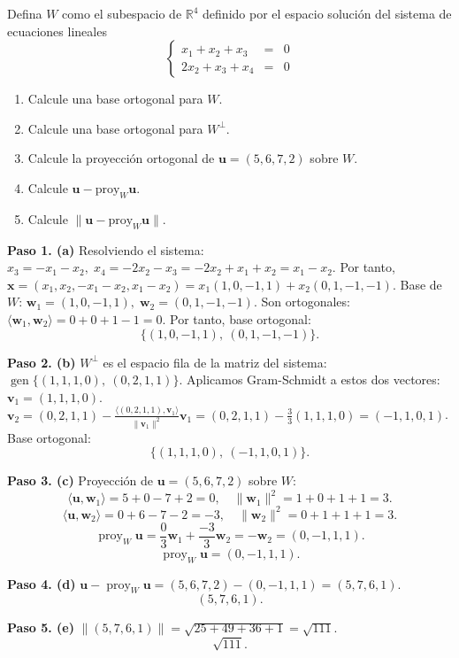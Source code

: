\begin{prob}
Defina $W$ como el subespacio de $\mathbb{R}^4$ definido por el espacio solución del sistema de ecuaciones lineales
\[
\left\lbrace
\begin{array}{ccc}
x_1+x_2+x_3&=&0\\
2x_2+x_3+x_4&=&0
\end{array}
\right.
\]
\begin{enumerate}
\item Calcule una base ortogonal para $W$.
\item Calcule una base ortogonal para $W^{\perp}$.
\item Calcule la proyección ortogonal de $\mathbf{u}=(5,6,7,2)$ sobre $W$.
\item Calcule $\mathbf{u}-\text{proy}_{W}\mathbf{u}$.
\item Calcule $\lVert \mathbf{u}-\text{proy}_{W}\mathbf{u}\rVert$.
\end{enumerate}
\begin{myproof}
\textbf{Paso 1. (a)} Resolviendo el sistema:
\( x_3 = -x_1 - x_2,\; x_4 = -2x_2 - x_3 = -2x_2 + x_1 + x_2 = x_1 - x_2 \).
Por tanto, \( \mathbf{x} = (x_1, x_2, -x_1 - x_2, x_1 - x_2) = x_1(1,0,-1,1) + x_2(0,1,-1,-1) \).
Base de \( W \): \( \mathbf{w}_1 = (1,0,-1,1),\; \mathbf{w}_2 = (0,1,-1,-1) \).
Son ortogonales: \( \langle \mathbf{w}_1, \mathbf{w}_2 \rangle = 0 + 0 + 1 -1 = 0 \).
Por tanto, base ortogonal:
\[
\boxed{\{(1,0,-1,1),\ (0,1,-1,-1)\}}.
\]

\textbf{Paso 2. (b)} \( W^\perp \) es el espacio fila de la matriz del sistema:
\( \operatorname{gen}\{(1,1,1,0),\ (0,2,1,1)\} \).
Aplicamos Gram-Schmidt a estos dos vectores:
\( \mathbf{v}_1 = (1,1,1,0) \).
\( \mathbf{v}_2 = (0,2,1,1) - \frac{\langle (0,2,1,1), \mathbf{v}_1 \rangle}{\|\mathbf{v}_1\|^2} \mathbf{v}_1
= (0,2,1,1) - \frac{3}{3}(1,1,1,0) = (-1,1,0,1) \).
Base ortogonal:
\[
\boxed{\{(1,1,1,0),\ (-1,1,0,1)\}}.
\]

\textbf{Paso 3. (c)} Proyección de \( \mathbf{u}=(5,6,7,2) \) sobre \( W \):
\[
\langle \mathbf{u}, \mathbf{w}_1 \rangle = 5 + 0 -7 + 2 = 0,\quad \|\mathbf{w}_1\|^2 = 1+0+1+1 = 3.
\]
\[
\langle \mathbf{u}, \mathbf{w}_2 \rangle = 0 + 6 -7 -2 = -3,\quad \|\mathbf{w}_2\|^2 = 0+1+1+1 = 3.
\]
\[
\operatorname{proy}_W \mathbf{u} = \frac{0}{3}\mathbf{w}_1 + \frac{-3}{3}\mathbf{w}_2 = -\mathbf{w}_2 = (0,-1,1,1).
\]
\[
\boxed{\operatorname{proy}_W \mathbf{u} = (0,-1,1,1)}.
\]

\textbf{Paso 4. (d)} \( \mathbf{u} - \operatorname{proy}_W \mathbf{u} = (5,6,7,2) - (0,-1,1,1) = (5,7,6,1) \).
\[
\boxed{(5,7,6,1)}.
\]

\textbf{Paso 5. (e)} \( \|(5,7,6,1)\| = \sqrt{25+49+36+1} = \sqrt{111} \).
\[
\boxed{\sqrt{111}}.
\]
\end{myproof}
\end{prob}

